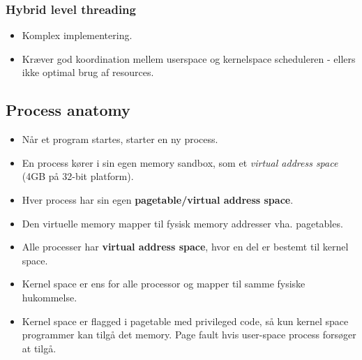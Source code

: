 
\subsubsection*{Hybrid level threading}
\begin{itemize}
	\item Komplex implementering.
	\item Kræver god koordination mellem userspace og kernelspace scheduleren - ellers ikke optimal brug af resources.
\end{itemize}


\subsection{Process anatomy}
\begin{itemize}
	\item Når et program startes, starter en ny process.
	\item En process kører i sin egen memory sandbox, som et \textit{virtual address space} (4GB på 32-bit platform).
	\item Hver process har sin egen \textbf{pagetable/virtual address space}.
	\item Den virtuelle memory mapper til fysisk memory addresser vha. pagetables.
	\item Alle processer har \textbf{virtual address space}, hvor en del er bestemt til kernel space.
	\item Kernel space er ens for alle processor og mapper til samme fysiske hukommelse.
	\item Kernel space er flagged i pagetable med privileged code, så kun kernel space programmer kan tilgå det memory. Page fault hvis user-space process forsøger at tilgå.
\end{itemize}


